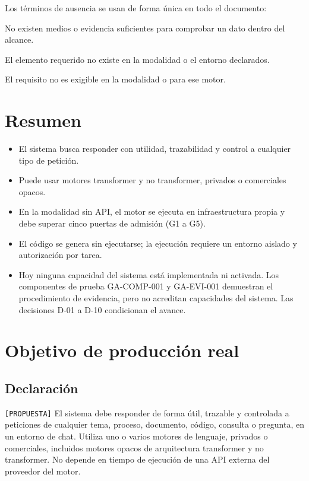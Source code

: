 \documentclass[12pt]{article}
\begin{document}
Los términos de ausencia se usan de forma única en todo el documento:

\begin{description}[leftmargin=4.2cm, style=nextline]
    \item[NO\_VERIFICABLE] No existen medios o evidencia suficientes para comprobar un dato dentro del alcance.
    \item[NO\_DISPONIBLE] El elemento requerido no existe en la modalidad o el entorno declarados.
    \item[NO\_APLICABLE] El requisito no es exigible en la modalidad o para ese motor.
\end{description}

\section{Resumen}

\begin{itemize}
    \item El sistema busca responder con utilidad, trazabilidad y control a cualquier tipo de petición.
    \item Puede usar motores transformer y no transformer, privados o comerciales opacos.
    \item En la modalidad sin API, el motor se ejecuta en infraestructura propia y debe superar cinco puertas de admisión (G1 a G5).
    \item El código se genera sin ejecutarse; la ejecución requiere un entorno aislado y autorización por tarea.
    \item Hoy ninguna capacidad del sistema está implementada ni activada. Los componentes de prueba GA-COMP-001 y GA-EVI-001 demuestran el procedimiento de evidencia, pero no acreditan capacidades del sistema. Las decisiones D-01 a D-10 condicionan el avance.
\end{itemize}

\section{Objetivo de producción real}

\subsection{Declaración}

\texttt{[PROPUESTA]} El sistema debe responder de forma útil, trazable y
controlada a peticiones de cualquier tema, proceso, documento, código,
consulta o pregunta, en un entorno de chat. Utiliza uno o varios motores de
lenguaje, privados o comerciales, incluidos motores opacos de arquitectura
transformer y no transformer. No depende en tiempo de ejecución de una API
externa del proveedor del motor.
\end{document}
